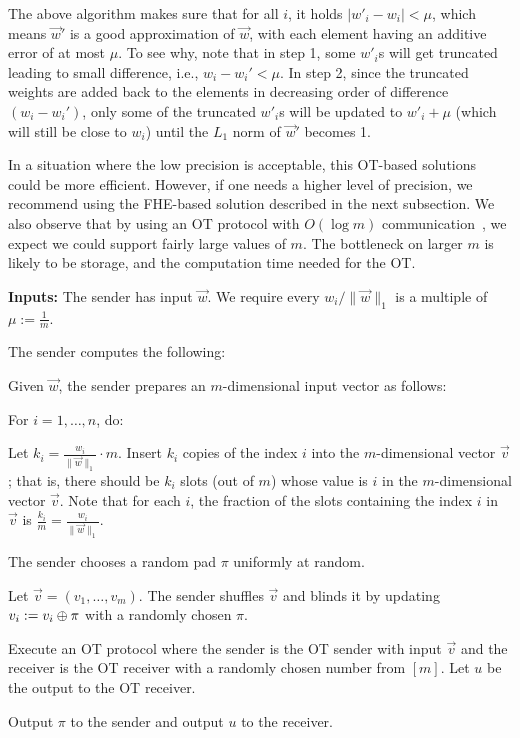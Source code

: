 The above algorithm makes sure that for all $i$, it holds $|w'_i - w_i|
< \mu$, which means $\vec{w}'$ is a good approximation of $\vec{w}$, with
each element having an additive error of at most $\mu$. To see why, note
that in step 1, some $w'_i$s will get truncated leading to small
difference, i.e., $w_i - w_i' < \mu$. In step 2, since the truncated
weights are added back to the elements in decreasing order of difference
$(w_i - w_i')$, only some of the truncated $w'_i$s will be updated to
$w'_i + \mu$ (which will still be close to $w_i$) until the $L_1$ norm
of $\vec{w}'$ becomes 1. 

In a situation where the low precision is acceptable, this OT-based
solutions could be more efficient. However, if one needs a higher level
of precision, we recommend using the FHE-based solution described in the
next subsection.  We also observe that by using an OT protocol with
$O(\log m)$ communication~\cite[Theorem 2.2]{IMS+09}, we expect we could
support fairly large values of $m$.  The bottleneck on larger $m$ is
likely to be storage, and the computation time needed for the OT.  

\begin{algorithm}[htbp]
\textbf{Inputs:} The sender has input $\vec{w}$. We require every
$w_{i}/\|\vec{w}\|_1$ is a multiple of $\mu := \frac 1 m$. 
\BEN
\item The sender computes the following: 

  \BEN
  \item 
    Given $\vec{w}$, the sender prepares an $m$-dimensional input vector as follows: 

  \item 
   For $i = 1, \ldots, n$, do: 
      \BEN
      \item[] Let $k_i = \frac{w_i}{\|\vec{w}\|_1} \cdot m$.  Insert $k_i$ copies of the index
      $i$ into the $m$-dimensional  vector $\vec{v}$; that
      is, there should be $k_i$ slots (out of $m$)  whose value is $i$ in the
      $m$-dimensional vector $\vec{v}$. 
      \EEN
    Note that for each $i$, the fraction of the slots containing the index
    $i$ in $\vec{v}$ is $\frac{k_i}{m} = \frac{w_i}{\|\vec{w}\|_1}$.  

  \item The sender chooses a random pad $\pi$ uniformly at random.

  \item Let $\vec{v} = (v_{1}, \ldots, v_{m})$. The sender shuffles
    $\vec{v}$ and blinds it by updating $v_{i} := v_{i} \oplus \pi$ with a
    randomly chosen $\pi$.
  \EEN

\item Execute an OT protocol where the sender is the OT sender with input
$\vec{v}$ and the receiver is the OT receiver with a randomly chosen number from
$[m]$. Let $u$ be the output to the OT receiver.

\item Output $\pi$ to the sender and output $u$ to the receiver. 
\EEN

\caption{Oblivious sampling protocol realizing $\F_{\oslone}$ based on
$1$-out-of-$m$ OT}
\label{fig:osample-ot}
\end{algorithm}


